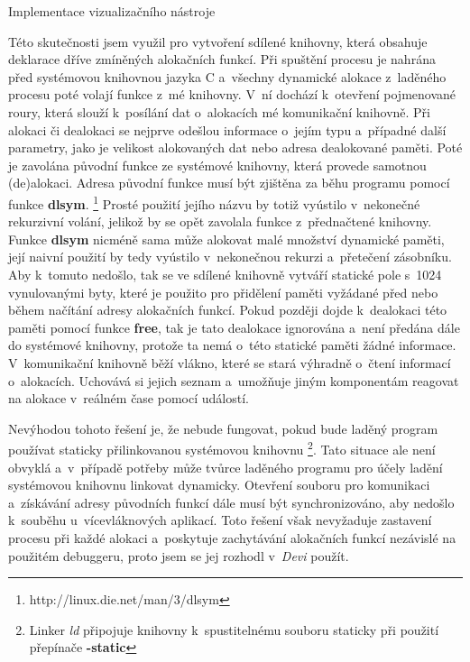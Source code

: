 \documentclass[czech,bachelor,male,python,dept460,hidelinks]{diploma}						%
\newcommand{\parspace}[1][]{
	\ifthenelse{\isempty{#1}}{\vspace{0mm}}{\vspace{#1}}
	\par
}
\begin{document}
\begin{section}{Implementace vizualizačního nástroje}
				\parspace Této skutečnosti jsem využil pro vytvoření sdílené knihovny, která obsahuje deklarace dříve zmíněných alokačních funkcí.
				Při spuštění procesu je nahrána před systémovou knihovnou jazyka C a~všechny dynamické alokace z~laděného procesu poté volají funkce z~mé knihovny.
				V~ní dochází k~otevření pojmenované roury, která slouží k~posílání dat o~alokacích mé komunikační knihovně.
				Při alokaci či dealokaci se nejprve odešlou informace o~jejím typu a~případné další parametry, jako je velikost alokovaných dat
				nebo adresa dealokované paměti. Poté je zavolána původní funkce ze systémové knihovny, která provede samotnou (de)alokaci.
				Adresa původní funkce musí být zjištěna za běhu programu pomocí
				funkce \textbf{dlsym}. \footnote{http://linux.die.net/man/3/dlsym} Prosté použití jejího názvu by totiž vyústilo v~nekonečné rekurzivní volání, jelikož
				by se opět zavolala funkce z~přednačtené knihovny. Funkce \textbf{dlsym} nicméně sama může alokovat malé množství dynamické paměti,
				její naivní použití by tedy vyústilo v~nekonečnou rekurzi a~přetečení zásobníku.
				Aby k~tomuto nedošlo, tak se ve sdílené knihovně vytváří statické pole s~1024 vynulovanými
				byty, které je použito pro přidělení paměti vyžádané před nebo během načítání adresy alokačních funkcí. Pokud později dojde k~dealokaci této
				paměti pomocí funkce \textbf{free}, tak je tato dealokace ignorována a~není předána dále do systémové knihovny, protože ta nemá o~této statické paměti
				žádné informace. V~komunikační knihovně běží vlákno, které se stará výhradně o~čtení informací o~alokacích. Uchovává si jejich seznam
				a~umožňuje jiným komponentám reagovat na alokace v~reálném čase pomocí událostí.
				
				\parspace Nevýhodou tohoto řešení je, že nebude fungovat, pokud bude laděný program používat staticky přilinkovanou systémovou knihovnu
				\footnote{Linker \textit{ld} připojuje knihovny k~spustitelnému souboru staticky při použití přepínače \textbf{-static}}.
				Tato situace ale není obvyklá a~v~případě potřeby může tvůrce laděného programu pro účely ladění systémovou knihovnu linkovat dynamicky.
				Otevření souboru pro komunikaci a~získávání adresy původních funkcí dále musí být synchronizováno, aby nedošlo k~souběhu u~vícevláknových aplikací.
				Toto řešení však nevyžaduje zastavení procesu při každé alokaci a~poskytuje zachytávání alokačních funkcí nezávislé na použitém debuggeru, proto
				jsem se jej rozhodl v~\textit{Devi} použít.
				
			

\end{section}
\end{document}
